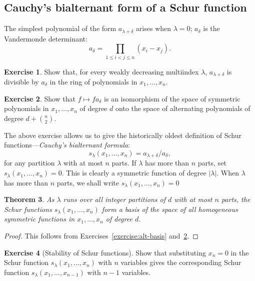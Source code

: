 \documentclass[12pt]{amsart}
\newtheorem{theorem}{Theorem}[subsection]
\theoremstyle{definition}
\theoremstyle{example}
\newtheorem{exercise}[theorem]{Exercise}
\begin{document}
\subsection{Cauchy's bialternant form of a Schur function}
\label{sec:cauchys-bialt-form}
The simplest polynomial of the form $a_{\lambda+\delta}$ arises when $\lambda=0$; $a_\delta$ is the Vandermonde determinant:
\begin{displaymath}
  a_\delta = \prod_{1\leq i<j\leq n}(x_i-x_j).
\end{displaymath}
\begin{exercise}
  Show that, for every weakly decreasing multiindex $\lambda$, $a_{\lambda+\delta}$ is divisible by $a_\delta$ in the ring of polynomials in $x_1,\dotsc,x_n$.
\end{exercise}
\begin{exercise}
  \label{exercise:vandermonde-iso}
  Show that $f\mapsto fa_\delta$ is an isomorphism of the space of symmetric polynomials in $x_1,\dotsc, x_n$ of degree $d$ onto the space of alternating polynomials of degree $d + \binom n2$.
\end{exercise}
The above exercise allows us to give the historically oldest definition of Schur functions---\emph{Cauchy's bialternant formula}:
\begin{equation}
  \label{eq:schur}
  s_\lambda(x_1,\dotsc,x_n) = a_{\lambda+\delta}/a_\delta,
\end{equation}
for any partition $\lambda$ with at most $n$ parts.
If $\lambda$ has more than $n$ parts, set $s_\lambda(x_1,\dotsc,x_n) =0$.
This is clearly a symmetric function of degree $|\lambda|$.
When $\lambda$ has more than $n$ parts, we shall write $s_\lambda(x_1,\dotsc,x_n)=0$
\begin{theorem}
  As $\lambda$ runs over all integer partitions of $d$ with at most $n$ parts, the Schur functions $s_\lambda(x_1,\dotsc,x_n)$ form a basis of the space of all homogeneous symmetric functions in $x_1,\dotsc,x_n$ of degree $d$.
\end{theorem}
\begin{proof}
  This follows from Exercises~\ref{exercise:alt-basis} and~\ref{exercise:vandermonde-iso}.
\end{proof}
\begin{exercise}
  [Stability of Schur functions]
  Show that substituting $x_n=0$ in the Schur function $s_\lambda(x_1,\dotsc, x_n)$ with $n$ variables gives the corresponding Schur function $s_\lambda(x_1,\dotsc,x_{n-1})$ with $n-1$ variables.
\end{exercise}
\end{document}
